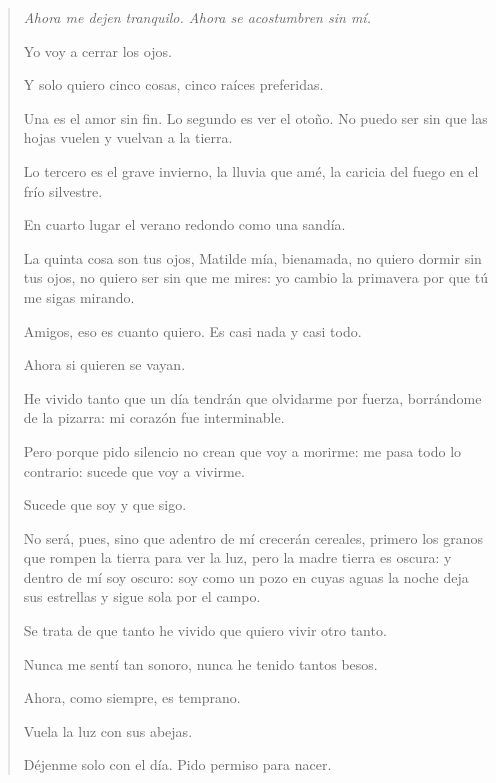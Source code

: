 \documentclass[12pt]{article}
\begin{document}
\clearpage
{}
\begin{verse}
\itshape
Ahora me dejen tranquilo.  
Ahora se acostumbren sin mí.  

Yo voy a cerrar los ojos.  

Y solo quiero cinco cosas,  
cinco raíces preferidas.  

Una es el amor sin fin.  
Lo segundo es ver el otoño.  
No puedo ser sin que las hojas  
vuelen y vuelvan a la tierra.  

Lo tercero es el grave invierno,  
la lluvia que amé, la caricia  
del fuego en el frío silvestre.  

En cuarto lugar el verano  
redondo como una sandía.  

La quinta cosa son tus ojos,  
Matilde mía, bienamada,  
no quiero dormir sin tus ojos,  
no quiero ser sin que me mires:  
yo cambio la primavera  
por que tú me sigas mirando.  

Amigos, eso es cuanto quiero.  
Es casi nada y casi todo.  

Ahora si quieren se vayan.  

He vivido tanto que un día  
tendrán que olvidarme por fuerza,  
borrándome de la pizarra:  
mi corazón fue interminable.  

Pero porque pido silencio  
no crean que voy a morirme:  
me pasa todo lo contrario:  
sucede que voy a vivirme.  

Sucede que soy y que sigo.  

No será, pues, sino que adentro  
de mí crecerán cereales,  
primero los granos que rompen  
la tierra para ver la luz,  
pero la madre tierra es oscura:  
y dentro de mí soy oscuro:  
soy como un pozo en cuyas aguas  
la noche deja sus estrellas  
y sigue sola por el campo.  

Se trata de que tanto he vivido  
que quiero vivir otro tanto.  

Nunca me sentí tan sonoro,  
nunca he tenido tantos besos.  

Ahora, como siempre, es temprano.  

Vuela la luz con sus abejas.  

Déjenme solo con el día.  
Pido permiso para nacer.  

\end{verse}
\end{document}
